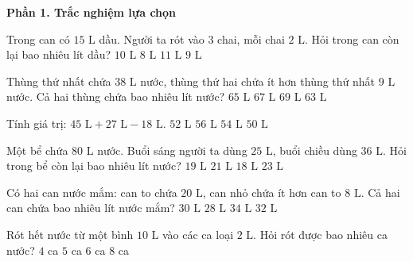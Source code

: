 \textbf{Phần 1. Trắc nghiệm lựa chọn}

\begin{ex} %
Trong can có $15\text{ L}$ dầu. Người ta rót vào $3$ chai, mỗi chai $2\text{ L}$. Hỏi trong can còn lại bao nhiêu lít dầu?
\choice
{$10\text{ L}$}
{$8\text{ L}$}
{$11\text{ L}$}
{\True $9\text{ L}$}
\end{ex}

\begin{ex} %
Thùng thứ nhất chứa $38\text{ L}$ nước, thùng thứ hai chứa ít hơn thùng thứ nhất $9\text{ L}$ nước. Cả hai thùng chứa bao nhiêu lít nước?
\choice
{$65\text{ L}$}
{\True $67\text{ L}$}
{$69\text{ L}$}
{$63\text{ L}$}
\end{ex}

\begin{ex} %
Tính giá trị: $45\text{ L} + 27\text{ L} - 18\text{ L}$.
\choice
{$52\text{ L}$}
{$56\text{ L}$}
{\True $54\text{ L}$}
{$50\text{ L}$}
\end{ex}

\begin{ex} %
Một bể chứa $80\text{ L}$ nước. Buổi sáng người ta dùng $25\text{ L}$, buổi chiều dùng $36\text{ L}$. Hỏi trong bể còn lại bao nhiêu lít nước?
\choice
{\True $19\text{ L}$}
{$21\text{ L}$}
{$18\text{ L}$}
{$23\text{ L}$}
\end{ex}

\begin{ex} %
Có hai can nước mắm: can to chứa $20\text{ L}$, can nhỏ chứa ít hơn can to $8\text{ L}$. Cả hai can chứa bao nhiêu lít nước mắm?
\choice
{$30\text{ L}$}
{$28\text{ L}$}
{$34\text{ L}$}
{\True $32\text{ L}$}
\end{ex}

\begin{ex} %
Rót hết nước từ một bình $10\text{ L}$ vào các ca loại $2\text{ L}$. Hỏi rót được bao nhiêu ca nước?
\choice
{$4$ ca}
{\True $5$ ca}
{$6$ ca}
{$8$ ca}
\end{ex}

